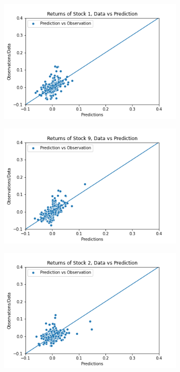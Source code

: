 \begin{figure}[b]%
	\centering
	\begin{subfigure}[l]{0.3\textwidth}
		\includegraphics[width=\textwidth]{img/07_2/elbo/Q1_kernel1_stock1_scatter.png}
	\end{subfigure}
	\begin{subfigure}[c]{0.3\textwidth}
		\includegraphics[width=\textwidth]{img/07_2/elbo/Q1_kernel1_stock9_scatter.png}
	\end{subfigure}
	\begin{subfigure}[r]{0.3\textwidth}
		\includegraphics[width=\textwidth]{img/07_2/elbo/Q1_kernel1_stock2_scatter.png}

\end{subfigure}
\end{figure}
